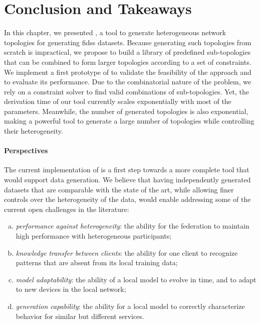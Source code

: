 \section{Conclusion and Takeaways\label{sec:topologies.conclusion}}

In this chapter, we presented \thecontrib, a tool to generate heterogeneous network topologies for generating \glspl{fids} datasets.
Because generating such topologies from scratch is impractical, we propose to build a library of predefined sub-topologies that can be combined to form larger topologies according to a set of constraints.
We implement a first prototype of \thecontrib to validate the feasibility of the approach and to evaluate its performance.
Due to the combinatorial nature of the problem, we rely on a constraint solver to find valid combinations of sub-topologies.
Yet, the derivation time of our tool currently scales exponentially with most of the parameters.
Meanwhile, the number of generated topologies is also exponential, making \thecontrib a powerful tool to generate a large number of topologies while controlling their heterogeneity.


\paragraph{Perspectives}

The current implementation of \thecontrib is a first step towards a more complete tool that would support data generation.
We believe that having independently generated datasets that are comparable with the state of the art, while allowing finer controls over the heterogeneity of the data, would enable addressing some of the current open challenges in the literature:
\begin{enumerate}[(a)]
  \item \emph{performance against heterogeneity}: the ability for the federation to maintain high
  performance with heterogeneous participants;
  \item \emph{knowledge transfer between clients}: the ability for one client to recognize
  patterns that are absent from its local training data;
  \item \emph{model adaptability}: the ability of a local model to evolve in time, and to adapt to
  new devices in the local network;
  \item \emph{generation capability}: the ability for a local model to correctly characterize
  behavior for similar but different services.
\end{enumerate}

